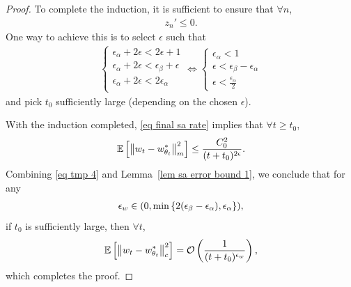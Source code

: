 \documentclass[twoside,11pt]{article}
\newcommand{\fO}{\mathcal{O}}
\newcommand{\E}{\mathbb{E}}
\numberwithin{assucounter}{section}
\begin{document}
\begin{proof}
To complete the induction,
it is sufficient to ensure that $\forall n$,
\begin{align}
  z_n' \leq 0.
\end{align}
One way to achieve this is to select $\epsilon$ such that
\begin{align}
  \begin{cases}
    \epsilon_\alpha + 2\epsilon < 2\epsilon + 1 \\
    \epsilon_\alpha + 2\epsilon < \epsilon_\beta + \epsilon \\
    \epsilon_\alpha + 2\epsilon < 2\epsilon_\alpha \\
  \end{cases}
  \iff
  \begin{cases}
    \epsilon_\alpha < 1 \\
    \epsilon < \epsilon_\beta - \epsilon_\alpha \\
    \epsilon < \frac{\epsilon_\alpha}{2}
  \end{cases}
\end{align}
and pick $t_0$ sufficiently large (depending on the chosen $\epsilon$).

With the induction completed,
\eqref{eq final sa rate} implies that $\forall t\geq t_0$,
\begin{align}
  \label{eq tmp 4}
  \E\left[\norm{w_{t} - w^*_{\theta_{t}}}_m^2\right] \leq \frac{C_0^2}{(t+t_0)^{2\epsilon}}.
\end{align}
Combining \eqref{eq tmp 4} and Lemma~\ref{lem sa error bound 1},
we conclude that
for any
\begin{align}
  \epsilon_w \in (0, \min\qty{2(\epsilon_\beta - \epsilon_\alpha), \epsilon_\alpha}),
\end{align}
if $t_0$ is sufficiently large,
then $\forall t$,
\begin{align}
  \E\left[\norm{w_{t} - w^*_{\theta_{t}}}_c^2\right] =\fO\left(\frac{1}{(t+t_0)^{\epsilon_w}}\right),
\end{align}
which completes the proof.
\end{proof}
\end{document}
